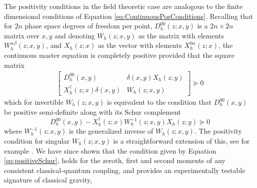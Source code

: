 \documentclass[aps,pra,showpacs,citeautoscript,amsmath,amssymb,floatfix,superscriptaddress,bbm, verbatim,amsfonts,changes,12pt,nofootinbib,longbibliography]{revtex4-2}
\def\z{{z}}
\def\rate{{W}}
\def\ab{^{\alpha\beta}}
\begin{document}
The positivity conditions in the field theoretic case are analogous to the finite dimensional conditions of Equation \eqref{eq:ContinuousPosConditions}. Recalling that for $2n$ phase space degrees of freedom per point, $D_{h}^{00}(\z;x,y)$ is a $2n\times 2n$ matrix over $x,y$ and denoting $\rate_h(\z;x,y)$ as the matrix with elements  $\rate_h\ab(\z;x,y)$, and $X_h(\z;x)$ as the vector with elements $X_h^{0\alpha}(\z;x)$, the continuous master equation is completely positive
provided that the square matrix
\begin{align}
\label{eq:positivity_continuous_field}
\begin{bmatrix}
D_h^{00}(x,y) & \delta(x,y) X_h(\z;y)\\ X_h^\dagger(\z;x)\delta(x,y) & \rate_h(\z;x,y)
\end{bmatrix} 
 \succeq 0 
\end{align}
which for invertible $\rate_h(\z;x,y)$ is equivalent to the condition that $D_h^{00}(x,y)$ be positive semi-definite along with its Schur complement
\begin{equation}
D_h^{00}(x,y) - X_h^\dagger(\z;x)\rate_h^{-1}(\z;x,y) X_h(\z;y) \succeq 0
 \label{eq:positiveSchur}
\end{equation}
where $\rate_h^{-1}(\z;x,y)$ is the generalized inverse of $\rate_h(\z;x,y)$. The positivity condition for singular $\rate_h(\z;x,y)$ is a straightforward extension of this, see for example \cite{boyd2004convex}. We have since shown that the condition given by Equation \eqref{eq:positiveSchur}, holds for the zeroth, first and second moments of any consistent classical-quantum coupling, and provides an experimentally testable signature of classical gravity\cite{oppenheim2021gravitationally},
\end{document}
